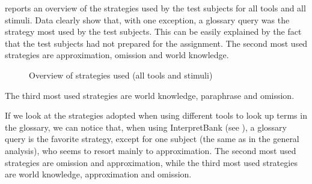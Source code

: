 \documentclass[output=paper]{langsci/langscibook}
\begin{document}
 reports an overview of the strategies used by the test subjects for all tools and all stimuli. Data clearly show that, with one exception, a glossary query was the strategy most used by the test subjects. This can be easily explained by the fact that the test subjects had not prepared for the assignment. The second most used strategies are approximation, omission and world knowledge.

\begin{figure}
\caption{Overview of strategies used (all tools and stimuli)} \label{fig:prandi:15}
\end{figure}

The third most used strategies are world knowledge, paraphrase and omission.

If we look at the strategies adopted when using different tools to look up terms in the glossary, we can notice that, when using InterpretBank (see ), a glossary query is the favorite strategy, except for one subject (the same as in the general analysis), who seems to resort mainly to approximation. The second most used strategies are omission and approximation, while the third most used strategies are world knowledge, approximation and omission.
\end{document}
